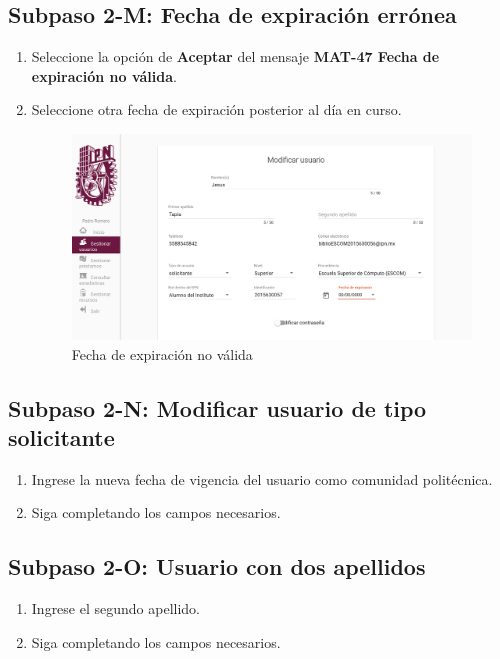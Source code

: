\subsection{Subpaso 2-M: Fecha de expiración errónea}
\begin{enumerate}
	\item Seleccione la opción de \textbf{Aceptar} del mensaje
\textbf{MAT-47 Fecha de expiración no válida}.
	\item Seleccione otra fecha de expiración posterior al día en curso.
	\begin{figure}[hbtp]
	\includegraphics[scale=0.3]{images/Interfaz/MAT-47 Fecha de expiración no válida.png}
	\caption{Fecha de expiración no válida}
	\end{figure}
\end{enumerate}

\subsection{Subpaso 2-N: Modificar usuario de tipo solicitante}
\begin{enumerate}
	\item Ingrese la nueva fecha de vigencia del usuario como comunidad politécnica.
\item Siga completando los campos necesarios.
\end{enumerate}

\subsection{Subpaso 2-O: Usuario con dos apellidos}
\begin{enumerate}
	\item Ingrese el segundo apellido.
\item Siga completando los campos necesarios.
\end{enumerate}

